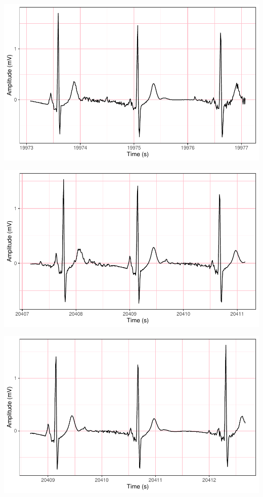 \documentclass[
]{article}
\begin{document}
\begin{center}\includegraphics{report_files/figure-latex/abnormal-interval-39} \end{center}

\begin{center}\includegraphics{report_files/figure-latex/abnormal-interval-40} \end{center}

\begin{center}\includegraphics{report_files/figure-latex/abnormal-interval-41} \end{center}
\end{document}
